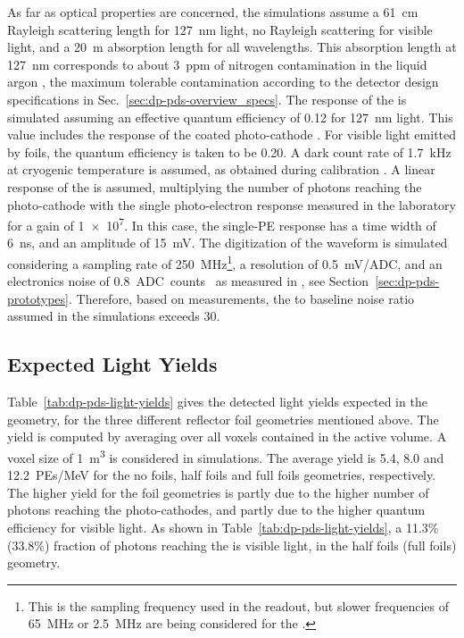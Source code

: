 As far as  optical properties are concerned, the simulations assume a \SI{61}{\cm} Rayleigh scattering length for \SI{127}{\nm} light, no Rayleigh scattering for visible light, and a \SI{20}{\m} absorption length for all wavelengths. This absorption length at \SI{127}{\nm} corresponds to about \SI{3}{ppm} of nitrogen contamination in the liquid argon \cite{Jones:2013bca}, the maximum tolerable contamination according to the detector design specifications in Sec.~\ref{sec:dp-pds-overview_specs}. The response of the  is simulated assuming an effective quantum efficiency of \num{0.12} for \SI{127}{\nm} light. This value includes the  response of the coated photo-cathode \cite{Bonesini:2018ubd}. For visible light emitted by  foils, the  quantum efficiency is taken to be \num{0.20}. A dark count rate of \SI{1.7}{\kilo\hertz} at cryogenic temperature is assumed, as obtained during   calibration \cite{Belver:2018erf}. A linear response of the  is assumed, multiplying the number of photons reaching the photo-cathode with the single photo-electron response measured in the laboratory for a gain of \num{1e7}. In this case, the single-PE response has a time width of \SI{6}{\nano\s}, and an amplitude of \SI{15}{mV}. The digitization of the waveform is simulated considering a sampling rate of \SI{250}{MHz}\footnote{This is the sampling frequency used in the  readout, but slower frequencies of \SI{65}{MHz} or \SI{2.5}{MHz} are being considered for the  .}, a resolution of \SI{0.5}{mV/ADC}, and an electronics noise of \SI{0.8}{ADC counts } as measured in , see Section~\ref{sec:dp-pds-prototypes}. Therefore, based on  measurements, the  to baseline noise  ratio assumed in the simulations exceeds \num{30}.


\subsection{Expected Light Yields}
\label{subsec:dp-pds-simulation_yields}

Table~\ref{tab:dp-pds-light-yields} gives the detected light yields expected in the \dune {} geometry, for the three different  reflector foil geometries mentioned above. The yield is computed by averaging over all \lar voxels contained in the  active volume. A voxel size of \SI{1}{\m^3} is considered in   simulations. The average yield is \num{5.4}, \num{8.0} and \SI{12.2}{PEs/MeV} for the no foils, half foils and full foils geometries, respectively. The higher yield for the foil geometries is partly due to the higher number of photons reaching the  photo-cathodes, and partly due to the higher  quantum efficiency for visible light. As shown in Table~\ref{tab:dp-pds-light-yields}, a 11.3\% (33.8\%) fraction of photons reaching the  is  visible light, in the half foils (full foils) geometry.

